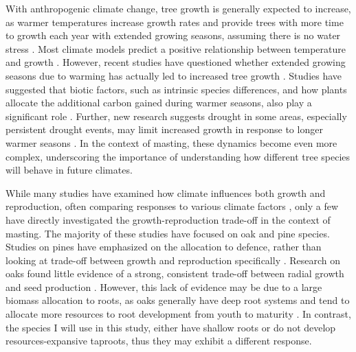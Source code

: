 \documentclass[11pt,letter]{article}
\begin{document}
With anthropogenic climate change, tree growth is generally expected to increase, as warmer temperatures increase growth rates and provide trees with more time to growth each year with extended growing seasons, assuming there is no water stress \citep{keenan2014net, finzi2020carbon}. Most climate models predict a positive relationship between temperature and growth \citep{friedlingstein2022global, ito2020global}. However, recent studies have questioned whether extended growing seasons due to warming has actually led to increased tree growth \citep{dow2022warm, green2022limits}. Studies have suggested that biotic factors, such as intrinsic species differences, and how plants allocate the additional carbon gained during warmer seasons, also play a significant role \citep{hacket2016consistent}. Further, new research suggests drought in some areas, especially persistent drought events, may limit increased growth in response to longer warmer seasons \citep{hajek2022mutually, hammond2022global, chen2025global}. In the context of masting, these dynamics become even more complex, underscoring the importance of understanding how different tree species will behave in future climates. 

While many studies have examined how climate influences both growth and reproduction, often comparing responses to various climate factors \citep{bajocco2021characterizing, koenig2020can, redmond2019resource, sanchez2011trade}, only a few have directly investigated the growth-reproduction trade-off in the context of masting. The majority of these studies have focused on oak and pine species. Studies on pines have emphasized on the allocation to defence, rather than looking at trade-off between growth and reproduction specifically \citep{larrinaga2024resource, redmond2019resource}. Research on oaks found little evidence of a strong, consistent trade-off between radial growth and seed production \citep{koenig2020can, patterson2023acorn}. However, this lack of evidence may be due to a  large biomass allocation to roots, as oaks generally have deep root systems and tend to allocate more resources to root development from youth to maturity \citep{burns1990silvics}. In contrast, the species I will use in this study, either have shallow roots or do not develop resources-expansive taproots, thus they may exhibit a different response.
\end{document}
